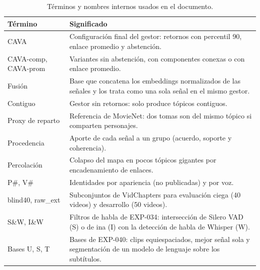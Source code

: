 \begin{table}[H]
    \centering
    \caption{Términos y nombres internos usados en el documento.}
    \label{tab:glosario}
    \small
    \begin{tabular}{p{3.2cm}p{10.2cm}}
        \hline
        \textbf{Término} & \textbf{Significado} \\
        \hline
        CAVA & Configuración final del gestor: retornos con percentil 90, enlace promedio y
               abstención. \\
        CAVA-comp, CAVA-prom & Variantes sin abstención, con componentes conexas o con enlace
                               promedio. \\
        Fusión & Base que concatena los embeddings normalizados de las señales y los trata
                 como una sola señal en el mismo gestor. \\
        Contiguo & Gestor sin retornos: solo produce tópicos contiguos. \\
        Proxy de reparto & Referencia de MovieNet: dos tomas son del mismo tópico si
                           comparten personajes. \\
        Procedencia & Aporte de cada señal a un grupo (acuerdo, soporte y coherencia). \\
        Percolación & Colapso del mapa en pocos tópicos gigantes por encadenamiento de
                      enlaces. \\
        P\#, V\# & Identidades por apariencia (no publicadas) y por voz. \\
        blind40, raw\_ext & Subconjuntos de VidChapters para evaluación ciega (40 videos) y
                            desarrollo (50 videos). \\
        S\&W, I\&W & Filtros de habla de EXP-034: intersección de Silero VAD (S) o de ina (I)
                        con la detección de habla de Whisper (W). \\
        Bases U, S, T & Bases de EXP-040: clips equiespaciados, mejor señal sola y
                        segmentación de un modelo de lenguaje sobre los subtítulos. \\
        \hline
    \end{tabular}
\end{table}

